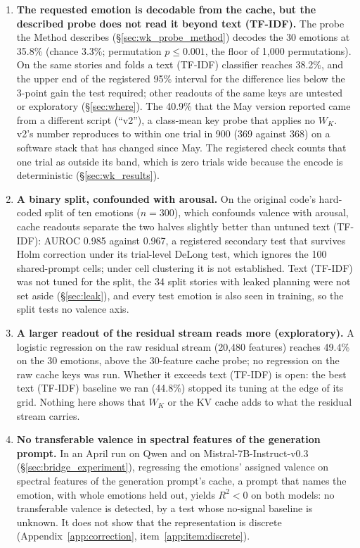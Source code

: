 \documentclass[11pt,a4paper]{article}
\begin{document}
\begin{enumerate}[nosep]
    \item \textbf{The requested emotion is decodable from the cache, but the described probe does not read it beyond text (TF-IDF).} The probe the Method describes (\S\ref{sec:wk_probe_method}) decodes the 30 emotions at 35.8\% (chance 3.3\%; permutation $p \leq 0.001$, the floor of 1{,}000 permutations). On the same stories and folds a text (TF-IDF) classifier reaches 38.2\%, and the upper end of the registered 95\% interval for the difference lies below the 3-point gain the test required; other readouts of the same keys are untested or exploratory (\S\ref{sec:where}). The 40.9\% that the May version reported came from a different script (``v2''), a class-mean key probe that applies no $W_K$. v2's number reproduces to within one trial in 900 (369 against 368) on a software stack that has changed since May. The registered check counts that one trial as outside its band, which is zero trials wide because the encode is deterministic (\S\ref{sec:wk_results}).

    \item \textbf{A binary split, confounded with arousal.} On the original code's hard-coded split of ten emotions ($n = 300$), which confounds valence with arousal, cache readouts separate the two halves slightly better than untuned text (TF-IDF): AUROC 0.985 against 0.967, a registered secondary test that survives Holm correction under its trial-level DeLong test, which ignores the 100 shared-prompt cells; under cell clustering it is not established. Text (TF-IDF) was not tuned for the split, the 34 split stories with leaked planning were not set aside (\S\ref{sec:leak}), and every test emotion is also seen in training, so the split tests no valence axis.

    \item \textbf{A larger readout of the residual stream reads more (exploratory).} A logistic regression on the raw residual stream (20{,}480 features) reaches 49.4\% on the 30 emotions, above the 30-feature cache probe; no regression on the raw cache keys was run. Whether it exceeds text (TF-IDF) is open: the best text (TF-IDF) baseline we ran (44.8\%) stopped its tuning at the edge of its grid. Nothing here shows that $W_K$ or the KV cache adds to what the residual stream carries.

    \item \textbf{No transferable valence in spectral features of the generation prompt.} In an April run on Qwen and on Mistral-7B-Instruct-v0.3 (\S\ref{sec:bridge_experiment}), regressing the emotions' assigned valence on spectral features of the generation prompt's cache, a prompt that names the emotion, with whole emotions held out, yields $R^2 < 0$ on both models: no transferable valence is detected, by a test whose no-signal baseline is unknown. It does not show that the representation is discrete (Appendix~\ref{app:correction}, item~\ref{app:item:discrete}).
\end{enumerate}
\end{document}
